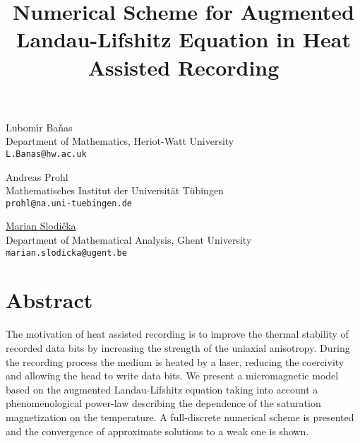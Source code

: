 \title{Numerical Scheme for Augmented Landau-Lifshitz Equation in Heat Assisted Recording}
\author{} \institute{}
\maketitle

\begin{center}
{\large Lubom\'\i r Ba\v nas}\\
Department of Mathematics, Heriot-Watt University\\
{\tt L.Banas@hw.ac.uk}\\
\vspace{4mm}

{\large Andreas Prohl}\\
Mathematisches Institut der Universit\"at T\"ubingen\\
{\tt prohl@na.uni-tuebingen.de}\\
\vspace{4mm}

{\large \underline{Marian Slodi\v{c}ka}}\\
Department of Mathematical Analysis, Ghent University\\
{\tt marian.slodicka@ugent.be}\\
\vspace{4mm}
\end{center}

\section*{Abstract}
 The motivation of heat assisted recording is to improve the thermal stability of recorded data bits by increasing the strength of the uniaxial anisotropy. During the recording process the medium is heated by a laser, reducing the coercivity and allowing the head to write data bits. We present a micromagnetic model based on the augmented Landau-Lifshitz equation taking into account a phenomenological power-law describing the dependence of the saturation magnetization on the temperature. A full-discrete numerical scheme is presented and the convergence of approximate solutions to a weak one is shown.